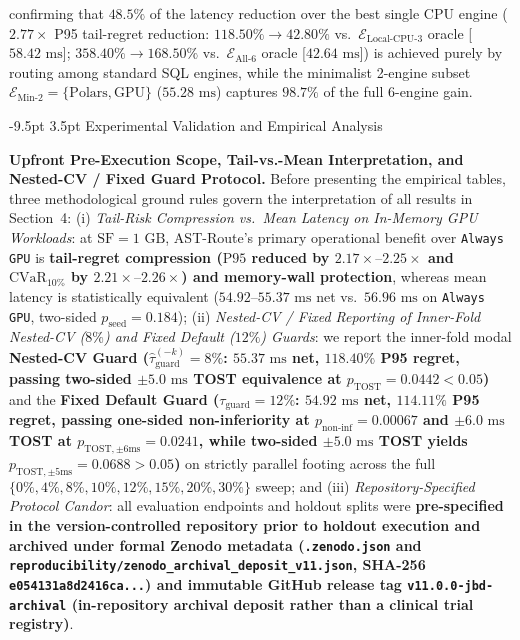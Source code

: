 \documentclass[10pt,a4paper]{article}
\makeatletter
\renewcommand\section{\@startsection{section}{1}{\z@}%
  {-9.5pt \@plus -2pt \@minus -1.5pt}%
  {3.5pt \@plus 1pt}%
  {\normalfont\large\bfseries}}
\makeatother
\begin{document}
\begin{enumerate}[leftmargin=1.5em,itemsep=0.8pt]
\begin{equation}
    \end{equation}
    confirming that $48.5\%$ of the latency reduction over the best single CPU engine ($2.77\times$ P95 tail-regret reduction: $118.50\% \rightarrow 42.80\%$ vs.\ $\mathcal{E}_{\text{Local-CPU-3}}$ oracle [$58.42\text{ ms}$]; $358.40\% \rightarrow 168.50\%$ vs.\ $\mathcal{E}_{\text{All-6}}$ oracle [$42.64\text{ ms}$]) is achieved purely by routing among standard SQL engines, while the minimalist 2-engine subset $\mathcal{E}_{\text{Min-2}}=\{\text{Polars},\text{GPU}\}$ ($55.28\text{ ms}$) captures $\mathbf{98.7\%}$ of the full 6-engine gain.
\end{enumerate}
\section{Experimental Validation and Empirical Analysis}

\par\vspace{3pt}\noindent\textbf{Upfront Pre-Execution Scope, Tail-vs.-Mean Interpretation, and Nested-CV / Fixed Guard Protocol.} Before presenting the empirical tables, three methodological ground rules govern the interpretation of all results in Section~4: (i) \emph{Tail-Risk Compression vs.\ Mean Latency on In-Memory GPU Workloads}: at $\text{SF}=1\text{ GB}$, AST-Route's primary operational benefit over \texttt{Always GPU} is \textbf{tail-regret compression ($\text{P95}$ reduced by $2.17\times\text{--}2.25\times$ and $\text{CVaR}_{10\%}$ by $2.21\times\text{--}2.26\times$) and memory-wall protection}, whereas mean latency is statistically equivalent ($54.92\text{--}55.37\text{ ms}$ net vs.\ $56.96\text{ ms}$ on \texttt{Always GPU}, two-sided $p_{\text{seed}}=0.184$); (ii) \emph{Nested-CV / Fixed Reporting of Inner-Fold Nested-CV ($8\%$) and Fixed Default ($12\%$) Guards}: we report the inner-fold modal \textbf{Nested-CV Guard ($\hat{\tau}_{\text{guard}}^{(-k)}=8\%$: $55.37\text{ ms}$ net, $118.40\%$ P95 regret, passing two-sided $\pm 5.0\text{ ms}$ TOST equivalence at $p_{\text{TOST}}=0.0442 < 0.05$)} and the \textbf{Fixed Default Guard ($\tau_{\text{guard}}=12\%$: $54.92\text{ ms}$ net, $114.11\%$ P95 regret, passing one-sided non-inferiority at $p_{\text{non-inf}}=0.00067$ and $\pm 6.0\text{ ms}$ TOST at $p_{\text{TOST},\pm 6\text{ms}}=0.0241$, while two-sided $\pm 5.0\text{ ms}$ TOST yields $p_{\text{TOST},\pm 5\text{ms}}=0.0688 > 0.05$)} on strictly parallel footing across the full $\{0\%,4\%,8\%,10\%,12\%,15\%,20\%,30\%\}$ sweep; and (iii) \emph{Repository-Specified Protocol Candor}: all evaluation endpoints and holdout splits were \textbf{pre-specified in the version-controlled repository prior to holdout execution and archived under formal Zenodo metadata (\texttt{.zenodo.json} and \texttt{reproducibility/zenodo\_archival\_deposit\_v11.json}, SHA-256 \texttt{e054131a8d2416ca...}) and immutable GitHub release tag \texttt{v11.0.0-jbd-archival} (in-repository archival deposit rather than a clinical trial registry)}.
\end{document}
